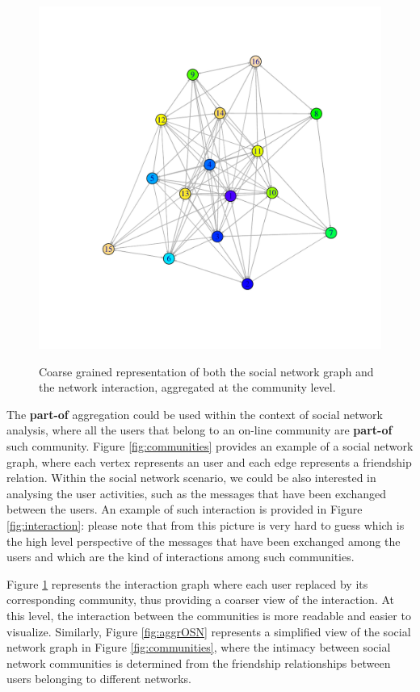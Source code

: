 \begin{figure}[!tp]
\begin{minipage}[!h]{0.7\textwidth}
		\includegraphics[width=\textwidth]{fig/01dataint/aggregated}
		\label{fig:aggrMSG}
	\end{minipage}
\caption{Coarse grained representation of both the social network graph and the network interaction, aggregated at the community level.}
\end{figure}

\begin{example}\label{ex:8}
The \textbf{part-of} aggregation could be used within the context of social network analysis, where all the users that belong to an on-line community are \textbf{part-of} such community. Figure \vref{fig:communities} provides an example of a social network graph, where each vertex represents an user and each edge represents a friendship relation. Within the social network scenario, we could be also interested in analysing the user activities, such as the messages that have been exchanged between the users. An example of such interaction is provided in Figure \ref{fig:interaction}: please note that from this picture is very hard to guess which is the high level perspective of the messages that have been exchanged among the users and which are the kind of interactions among such communities.

Figure \ref{fig:aggrMSG} represents the interaction graph where each user replaced by its corresponding community, thus providing a coarser view of the interaction. At this level, the interaction between the communities is more readable and easier to visualize. Similarly, Figure \ref{fig:aggrOSN} represents a simplified view of the social network graph in Figure \ref{fig:communities}, where the intimacy between social network communities is determined from the friendship relationships between users belonging to different networks.
\end{example}

